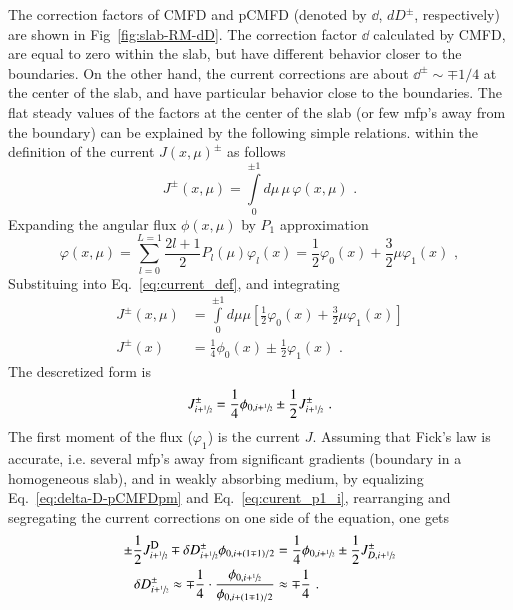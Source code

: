 The correction factors of CMFD and pCMFD (denoted by $\dd$, $dD^{\pm}$, respectively) are shown in Fig~\ref{fig:slab-RM-dD}. The correction factor $\dd$ calculated by CMFD, are equal to zero within the slab, but have different behavior closer to the boundaries. On the other hand, the current corrections are about $\dd^{\pm} \sim \mp 1/4$ at the center of the slab, and have particular behavior close to the boundaries. The flat steady values of the factors at the center of the slab (or few mfp's away from the boundary) can be explained by the following simple relations.  within the definition of the current $J(x,\mu)^\pm$ as follows
\begin{equation}
\label{eq:current_def}
J^\pm(x,\mu) = \int\limits_0^{\pm 1} d\mu\,\mu\,\varphi(x,\mu)\,\,.
\end{equation}
Expanding the angular flux $\phi(x,\mu)$ by $P_1$ approximation
\begin{equation}
\label{eq:p1}
\varphi(x,\mu) = \sum\limits_{l=0}^{L=1}\frac{2l+1}{2}P_l(\mu)\varphi_l(x) = \frac{1}{2}\varphi_0(x) + \frac{3}{2}\mu\varphi_1(x)\,\,,
\end{equation}
Substituing into Eq.~\ref{eq:current_def}, and integrating
\begin{equation}
	\begin{split}
		\label{eq:current_p1}
		J^\pm(x,\mu) &= \int\limits_0^{\pm 1} d\mu\mu\left[\frac{1}{2}\varphi_0(x) + \frac{3}{2}\mu\varphi_1(x)\right] \\
		J^\pm(x) &= \frac{1}{4}\phi_0(x) \pm \frac{1}{2}\varphi_1(x)\,\,.
	\end{split}
\end{equation}
The descretized form is
\begin{equation}
\label{eq:curent_p1_i}
J^\pm_{i+\sfrac{1}{2}} = \frac{1}{4}\phi_{0,i+\sfrac{1}{2}} \pm \frac{1}{2}J^{\pm}_{i+\sfrac{1}{2}}\,\,.
\end{equation}
The first moment of the flux ($\varphi_1$) is the current $J$. Assuming that Fick's law is accurate, i.e. several mfp's away from significant gradients (boundary in a homogeneous slab), and in weakly absorbing medium, 
by equalizing Eq.~\ref{eq:delta-D-pCMFDpm} and Eq.~\ref{eq:curent_p1_i}, rearranging and segregating the current corrections on one side of the equation, one gets
\begin{equation}
	\label{eq:dd_quarter}
	\begin{split}
	\pm \frac{1}{2}\jD_{i+\hzi} \mp \delta D^{\pm} _{i+\hzi} \phi_{0,i+(1\mp 1)/2} & = \frac{1}{4}\phi_{0,i+\hzi} \pm \frac{1}{2} J^{\pm}_{D,i+\hzi} \\
	\dd^\pm_{i+\hzi} \approx \mp \frac{1}{4}\cdot\frac{\phi_{0,i+\hzi}}{\phi_{0,i+(1\mp 1)/2}} & \approx \mp\frac{1}{4}\,\,.
	\end{split}
\end{equation}

